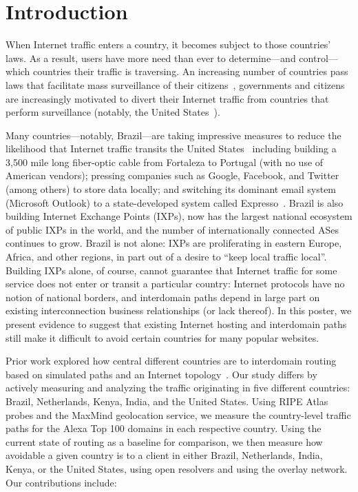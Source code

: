 \section{Introduction}

When Internet traffic enters a country, it becomes subject to those
countries' laws.  As a result, users have more need than ever to
determine---and control---which countries their traffic is traversing.
An increasing number of countries pass laws that facilitate mass
surveillance of their citizens~\cite{
  netherlands_surveillance, uk_bill}, governments
and citizens are increasingly motivated to divert their Internet traffic
from countries that perform surveillance (notably, the United
States~\cite{brazil_cable}).

Many countries---notably, Brazil---are taking impressive measures to reduce
the likelihood that Internet traffic transits the United
States~\cite{brazil_cable} including building a 3,500
mile long fiber-optic cable from Fortaleza to Portugal (with no use of
American vendors); pressing companies such as Google, Facebook, and
Twitter (among others) to store data locally; and switching its dominant
email system (Microsoft Outlook) to a state-developed system called
Expresso~\cite{brazil_cable}.  Brazil is also
building Internet Exchange Points (IXPs), now has the
largest national ecosystem of public IXPs in
the world, and the number of internationally
connected ASes continues to
grow. Brazil is not alone: IXPs are
proliferating in eastern Europe, Africa, and other regions, in part out
of a desire to ``keep local traffic local''. Building IXPs alone, of
course, cannot guarantee that Internet traffic for some service does not
enter or transit a particular country: Internet protocols have no notion
of national borders, and interdomain paths depend in large part on
existing interconnection business relationships (or lack thereof).  In
this poster, we present evidence to suggest that existing Internet
hosting and interdomain paths still make it difficult to avoid certain
countries for many popular websites. 

Prior work explored how central different countries are to interdomain 
routing based on simulated paths and an Internet topology~\cite{karlin2009nation}. 
Our study differs by actively measuring and analyzing the traffic originating in
five different countries: Brazil, Netherlands, Kenya, India, and the
United States.  Using RIPE Atlas probes and the MaxMind geolocation
service, we measure the country-level traffic paths for the Alexa Top
100 domains in each respective country.  Using the current state of
routing as a baseline for comparison, we then measure how avoidable a
given country is to a client in either Brazil, Netherlands, India,
Kenya, or the United States, using open resolvers and using the overlay
network.  Our contributions include: 

